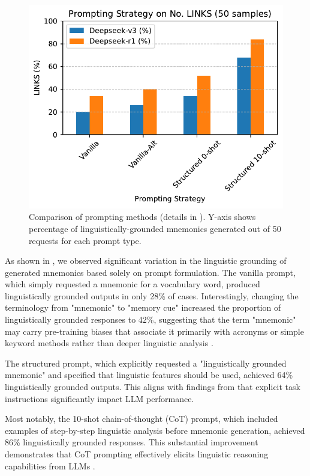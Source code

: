 \begin{figure}[htb]
  \centering
  \includegraphics[width=\linewidth]{figures/prompt_comparison.pdf}
  \caption{Comparison of prompting methods (details in ). Y-axis shows percentage of linguistically-grounded mnemonics generated out of 50 requests for each prompt type.}
  \label{fig:prompting-methods}
\end{figure}

As shown in , we observed significant variation in the linguistic grounding of generated mnemonics based solely on prompt formulation. The vanilla prompt, which simply requested a mnemonic for a vocabulary word, produced linguistically grounded outputs in only 28\% of cases. Interestingly, changing the terminology from "mnemonic" to "memory cue" increased the proportion of linguistically grounded responses to 42\%, suggesting that the term "mnemonic" may carry pre-training biases that associate it primarily with acronyms or simple keyword methods rather than deeper linguistic analysis \citep{hackmannWordImportanceExplains2024}.

The structured prompt, which explicitly requested a "linguistically grounded mnemonic" and specified that linguistic features should be used, achieved 64\% linguistically grounded outputs. This aligns with findings from \citet{yinDidYouRead2023} that explicit task instructions significantly impact LLM performance.

Most notably, the 10-shot chain-of-thought (CoT) prompt, which included examples of step-by-step linguistic analysis before mnemonic generation, achieved 86\% linguistically grounded responses. This substantial improvement demonstrates that CoT prompting effectively elicits linguistic reasoning capabilities from LLMs \citep{weiChainofThoughtPromptingElicits2023}.

